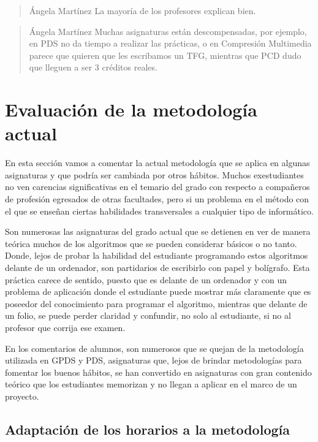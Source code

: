 \begin{quote}{Ángela Martínez}
    La mayoría de los profesores explican bien.
\end{quote}

\begin{quote}{Ángela Martínez}
    Muchas asignaturas están descompensadas, por ejemplo, en PDS
    no da tiempo a realizar las prácticas, o en Compresión Multimedia
    parece que quieren que les escribamos un TFG, mientras que PCD 
    dudo que lleguen a ser 3 créditos reales. 
\end{quote}


\section{Evaluación de la metodología actual}

En esta sección vamos a comentar la actual metodología
que se aplica en algunas asignaturas y que podría ser
cambiada por otros hábitos. Muchos exestudiantes no ven 
carencias significativas en el temario del grado con 
respecto a compañeros de profesión egresados de otras 
facultades, pero si un problema en el método con el que 
se enseñan ciertas habilidades transversales a cualquier 
tipo de informático.

Son numerosas las asignaturas del grado actual que 
se detienen en ver de manera teórica muchos de los
algoritmos que se pueden considerar básicos o no tanto.
Donde, lejos de probar la habilidad del estudiante programando
estos algoritmos delante de un ordenador, son partidarios
de escribirlo con papel y bolígrafo. Esta práctica carece 
de sentido, puesto que es delante de un ordenador y con 
un problema de aplicación donde el estudiante puede mostrar 
más claramente que es poseedor del conocimiento para programar
el algoritmo, mientras que delante de un folio, se puede perder 
claridad y confundir, no solo al estudiante, si no al profesor que 
corrija ese examen.

En los comentarios de alumnos, son numerosos que se quejan de 
la metodología utilizada en GPDS y PDS, asignaturas que, lejos
de brindar metodologías para fomentar los buenos hábitos, se han 
convertido en asignaturas con gran contenido teórico que los
estudiantes memorizan y no llegan a aplicar en el marco de un
proyecto.


\subsection{Adaptación de los horarios a la metodología}

